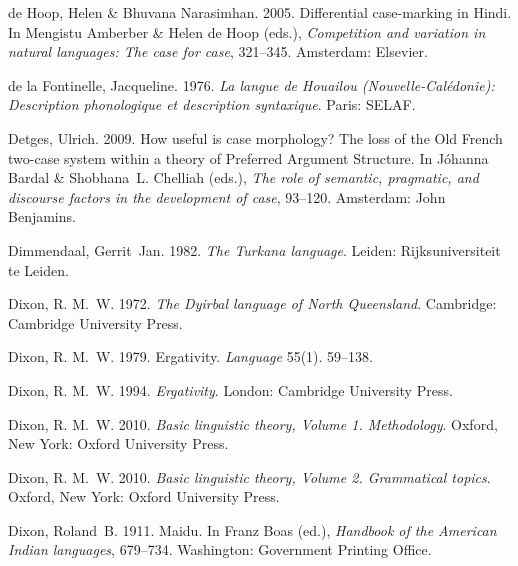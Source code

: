 \documentclass[ number=1
			   ,series=sidl
				,url=http://langsci-press.org/catalog/book/18 
			   ,isbn=978-3-944675-19-0
			   ,output=long   %
			  ]{LSP/langsci}
\begin{document}
\begin{thebibliography}{190}
{de Hoop}, Helen \& Bhuvana Narasimhan. 2005.
\newblock Differential case-marking in {H}indi.
\newblock In Mengistu Amberber \& Helen {de Hoop} (eds.), \emph{Competition and
  variation in natural languages: {T}he case for case}, 321--345. Amsterdam:
  Elsevier.

{de la Fontinelle}, Jacqueline. 1976.
\newblock \emph{La langue de {H}ouailou ({N}ouvelle-{C}al{\'e}donie):
  {D}escription phonologique et description syntaxique}.
\newblock Paris: SELAF.
\enlargethispage{\baselineskip}

Detges, Ulrich. 2009.
\newblock How useful is case morphology? {T}he loss of the {O}ld {F}rench
  two-case system within a theory of {P}referred {A}rgument {S}tructure.
\newblock In J{\'o}hanna Bar{\dh}dal \& Shobhana~L. Chelliah (eds.), \emph{The
  role of semantic, pragmatic, and discourse factors in the development of
  case}, 93--120. Amsterdam: John Benjamins.

Dimmendaal, Gerrit~Jan. 1982.
\newblock \emph{The {T}urkana language}.
\newblock Leiden: Rijksuniversiteit te Leiden.

Dixon, R. M.~W. 1972.
\newblock \emph{The {D}yirbal language of {N}orth {Q}ueensland}.
\newblock Cambridge: Cambridge University Press.

Dixon, R. M.~W. 1979.
\newblock Ergativity.
\newblock \emph{Language} 55(1). 59--138.

Dixon, R. M.~W. 1994.
\newblock \emph{Ergativity}.
\newblock London: Cambridge University Press.

Dixon, R. M.~W. 2010{}.
\newblock \emph{Basic linguistic theory, {V}olume 1. {M}ethodology}.
\newblock Oxford, New York: Oxford University Press.

Dixon, R. M.~W. 2010{}.
\newblock \emph{Basic linguistic theory, {V}olume 2. {G}rammatical topics}.
\newblock Oxford, New York: Oxford University Press.

Dixon, Roland~B. 1911.
\newblock Maidu.
\newblock In Franz Boas (ed.), \emph{{H}andbook of the {A}merican {I}ndian
  languages}, 679--734. Washington: Government Printing Office.


\end{thebibliography}
\end{document}
